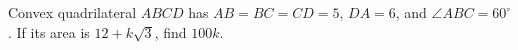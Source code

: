 Convex quadrilateral $ABCD$ has $AB=BC=CD=5$, $DA=6$, and $\angle ABC=60^\circ$. If its area is $12+k\sqrt3$, find $100k$.
